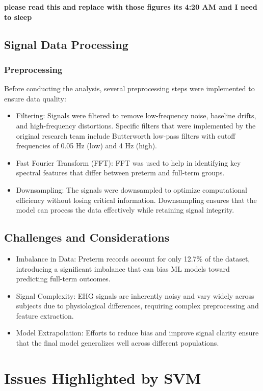 \documentclass[conference]{IEEEtran}
\begin{document}
  \textbf{please read this and replace with those figures its 4:20 AM and I need to sleep}

\subsection{Signal Data Processing}
\subsubsection{Preprocessing}
Before conducting the analysis, several preprocessing steps were implemented to ensure data quality:
\begin{itemize}
  \item Filtering:
Signals were filtered to remove low-frequency noise, baseline drifts, and high-frequency distortions.
Specific filters that were implemented by the original research team include Butterworth low-pass filters with cutoff frequencies of 0.05 Hz (low) and 4 Hz (high).
\item Fast Fourier Transform (FFT):
FFT was used to help in identifying key spectral features that differ between preterm and full-term groups.
\item Downsampling:
The signals were downsampled to optimize computational efficiency without losing critical information.
Downsampling ensures that the model can process the data effectively while retaining signal integrity.
\end{itemize}

\subsection{Challenges and Considerations}
\begin{itemize}
  \item Imbalance in Data:
Preterm records account for only 12.7\% of the dataset, introducing a significant imbalance that can bias ML models toward predicting full-term outcomes.
\item Signal Complexity:
EHG signals are inherently noisy and vary widely across subjects due to physiological differences, requiring complex preprocessing and feature extraction.
\item Model Extrapolation:
Efforts to reduce bias and improve signal clarity ensure that the final model generalizes well across different populations.
\end{itemize}

\section{Issues Highlighted by SVM}
\end{document}
